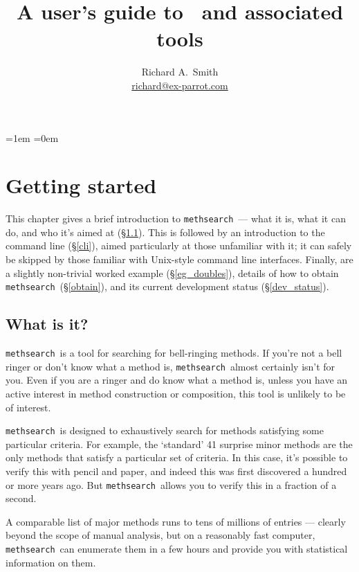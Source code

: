 \documentclass[a4paper,11pt,oneside]{book}
\title{A user's guide to \methsearch\ and associated tools}
\author{Richard A.\ Smith\\\url{richard@ex-parrot.com}}
\def\methsearch{\texttt{meth\-search}}
\newcommand{\sref}[1]{\hyperref[#1]{\S\ref{#1}}}
\begin{document}
\frontmatter
\maketitle
{}

\tableofcontents
\parskip=1em
\parindent=0em
\addtolength{\footnotesep}{4pt}

\mainmatter

\chapter{Getting started}

This chapter gives a brief introduction to \methsearch\ --- what it is,
what it can do, and who it's aimed at (\sref{what_is_it}).  
This is followed by an introduction to the command line (\sref{cli}),
aimed particularly at those unfamiliar with it; it can safely be
skipped by those familiar with Unix-style command line interfaces.  
Finally, are 
a slightly non-trivial worked example (\sref{eg_doubles}),
details of how to obtain \methsearch\ (\sref{obtain}), and its
current development status (\sref{dev_status}).


\section{What is it?}\label{what_is_it}

\methsearch\ is a tool for searching for bell-ringing methods.
If you're not a bell ringer or don't know what a method is, 
\methsearch\ almost certainly isn't for you.
Even if you are a ringer and do know what a method is, unless you have 
an active interest in method construction or composition, 
this tool is unlikely to be of interest.

\methsearch\ is designed to exhaustively search for methods satisfying
some particular criteria.  For example, the `standard' 41 surprise minor
methods are the only methods that satisfy a particular set of criteria.
In this case, it's possible to verify this with pencil and paper, and 
indeed this was first discovered a hundred or more years ago.  But 
\methsearch\ allows you to verify this in a fraction of a second.

A comparable list of major methods runs to tens of millions of entries ---
clearly beyond the scope of manual analysis, but on a reasonably 
fast computer, \methsearch\ can enumerate them in a few hours and provide 
you with statistical information on them.
\end{document}
